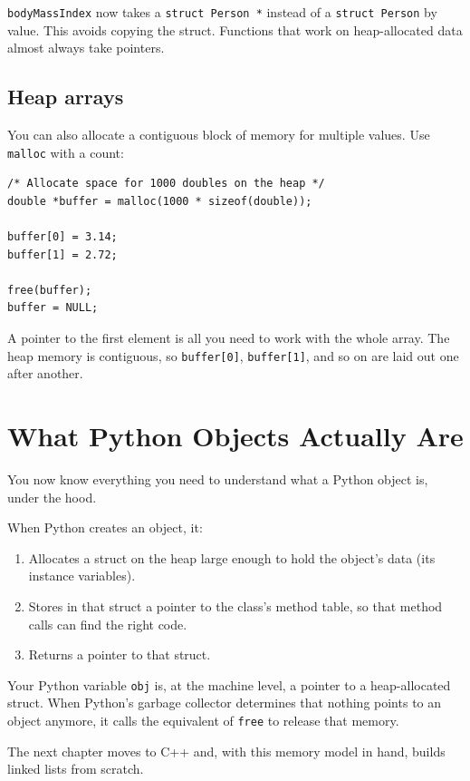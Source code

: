 \texttt{bodyMassIndex} now takes a \texttt{struct Person *} instead of
a \texttt{struct Person} by value.  This avoids copying the struct.
Functions that work on heap-allocated data almost always take pointers.

\subsection{Heap arrays}

You can also allocate a contiguous block of memory for multiple values.
Use \texttt{malloc} with a count:

\begin{verbatim}
/* Allocate space for 1000 doubles on the heap */
double *buffer = malloc(1000 * sizeof(double));

buffer[0] = 3.14;
buffer[1] = 2.72;

free(buffer);
buffer = NULL;
\end{verbatim}

A pointer to the first element is all you need to work with the whole
array.  The heap memory is contiguous, so \texttt{buffer[0]},
\texttt{buffer[1]}, and so on are laid out one after another.

\section{What Python Objects Actually Are}

You now know everything you need to understand what a Python object is,
under the hood.

When Python creates an object, it:
\begin{enumerate}
\item Allocates a struct on the heap large enough to hold the object's
  data (its instance variables).
\item Stores in that struct a pointer to the class's method table,
  so that method calls can find the right code.
\item Returns a pointer to that struct.
\end{enumerate}

Your Python variable \texttt{obj} is, at the machine level, a pointer
to a heap-allocated struct.  When Python's garbage collector determines
that nothing points to an object anymore, it calls the equivalent of
\texttt{free} to release that memory.

The next chapter moves to C++ and, with this memory model in hand, builds
linked lists from scratch.

